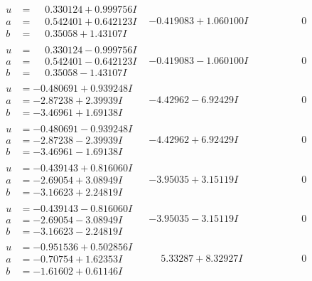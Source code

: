 \documentclass[1p]{elsarticle_modified}
\theoremstyle{definition}
\begin{document}
$$\begin{array}{c|c|c}
\begin{aligned}
u &= \phantom{-}0.330124 + 0.999756 I \\
a &= \phantom{-}0.542401 + 0.642123 I \\
b &= \phantom{-}0.35058 + 1.43107 I\end{aligned}
 & -0.419083 + 1.060100 I & \phantom{-0.000000 } 0 \\ \hline\begin{aligned}
u &= \phantom{-}0.330124 - 0.999756 I \\
a &= \phantom{-}0.542401 - 0.642123 I \\
b &= \phantom{-}0.35058 - 1.43107 I\end{aligned}
 & -0.419083 - 1.060100 I & \phantom{-0.000000 } 0 \\ \hline\begin{aligned}
u &= -0.480691 + 0.939248 I \\
a &= -2.87238 + 2.39939 I \\
b &= -3.46961 + 1.69138 I\end{aligned}
 & -4.42962 - 6.92429 I & \phantom{-0.000000 } 0 \\ \hline\begin{aligned}
u &= -0.480691 - 0.939248 I \\
a &= -2.87238 - 2.39939 I \\
b &= -3.46961 - 1.69138 I\end{aligned}
 & -4.42962 + 6.92429 I & \phantom{-0.000000 } 0 \\ \hline\begin{aligned}
u &= -0.439143 + 0.816060 I \\
a &= -2.69054 + 3.08949 I \\
b &= -3.16623 + 2.24819 I\end{aligned}
 & -3.95035 + 3.15119 I & \phantom{-0.000000 } 0 \\ \hline\begin{aligned}
u &= -0.439143 - 0.816060 I \\
a &= -2.69054 - 3.08949 I \\
b &= -3.16623 - 2.24819 I\end{aligned}
 & -3.95035 - 3.15119 I & \phantom{-0.000000 } 0 \\ \hline\begin{aligned}
u &= -0.951536 + 0.502856 I \\
a &= -0.70754 + 1.62353 I \\
b &= -1.61602 + 0.61146 I\end{aligned}
 & \phantom{-}5.33287 + 8.32927 I & \phantom{-0.000000 } 0 \\ \hline\begin{aligned}

\end{aligned}
\end{array}$$
\end{document}
